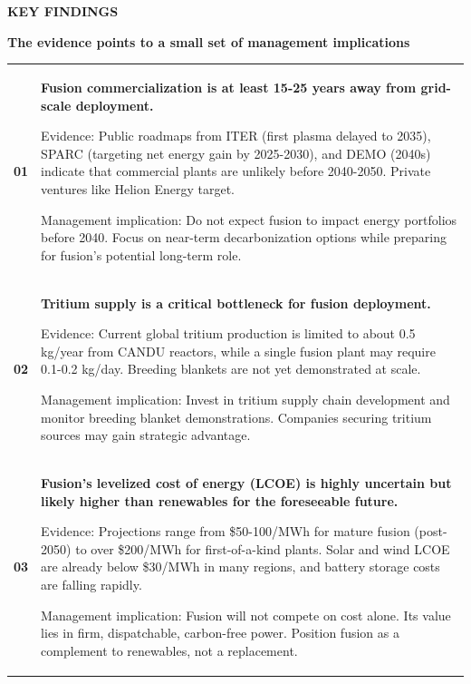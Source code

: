 \documentclass[10pt,a4paper]{article}
\begin{document}
\clearpage
{\textcolor{BOBlue}{\scriptsize\bfseries KEY FINDINGS}}\par\vspace{-1pt}
{\Large\sffamily\bfseries\color{BONavy} The evidence points to a small set of management implications}\par\vspace{4pt}
\vspace{2pt}{\color{BOBright}\rule{\linewidth}{1pt}}\vspace{5pt}
\begin{tabularx}{\linewidth}{p{9mm}Y}
\textcolor{BOBlue}{\bfseries 01} & {\small\bfseries Fusion commercialization is at least 15-25 years away from grid-scale deployment.}\par{\scriptsize\color{BOMuted} Evidence: Public roadmaps from ITER (first plasma delayed to 2035), SPARC (targeting net energy gain by 2025-2030), and DEMO (2040s) indicate that commercial plants are unlikely before 2040-2050. Private ventures like Helion Energy target.}\par{\scriptsize\color{BOMuted} Management implication: Do not expect fusion to impact energy portfolios before 2040. Focus on near-term decarbonization options while preparing for fusion's potential long-term role.} \\[6pt]
\textcolor{BOBlue}{\bfseries 02} & {\small\bfseries Tritium supply is a critical bottleneck for fusion deployment.}\par{\scriptsize\color{BOMuted} Evidence: Current global tritium production is limited to about 0.5 kg/year from CANDU reactors, while a single fusion plant may require 0.1-0.2 kg/day. Breeding blankets are not yet demonstrated at scale.}\par{\scriptsize\color{BOMuted} Management implication: Invest in tritium supply chain development and monitor breeding blanket demonstrations. Companies securing tritium sources may gain strategic advantage.} \\[6pt]
\textcolor{BOBlue}{\bfseries 03} & {\small\bfseries Fusion's levelized cost of energy (LCOE) is highly uncertain but likely higher than renewables for the foreseeable future.}\par{\scriptsize\color{BOMuted} Evidence: Projections range from \$50-100/MWh for mature fusion (post-2050) to over \$200/MWh for first-of-a-kind plants. Solar and wind LCOE are already below \$30/MWh in many regions, and battery storage costs are falling rapidly.}\par{\scriptsize\color{BOMuted} Management implication: Fusion will not compete on cost alone. Its value lies in firm, dispatchable, carbon-free power. Position fusion as a complement to renewables, not a replacement.} \\[6pt]

\end{tabularx}
\end{document}
